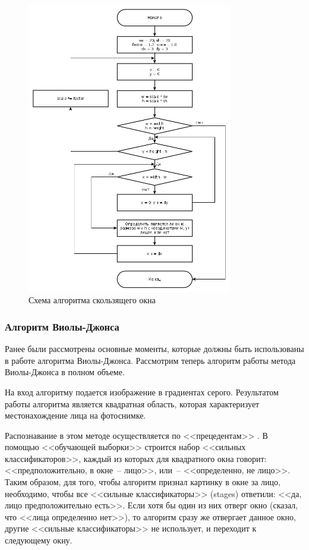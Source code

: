 \begin{figure}[p]
    \centering
    \includegraphics[width=0.8\textwidth]{lala_window.png}
    \caption{Схема алгоритма скользящего окна}
    \label{fig:lala_window}
\end{figure}

\subsubsection{Алгоритм Виолы-Джонса}

Ранее были рассмотрены основные моменты, которые должны быть использованы в работе алгоритма
Виолы-Джонса. Рассмотрим теперь алгоритм работы метода Виолы-Джонса в полном объеме.

На вход алгоритму подается изображение в градиентах серого. Результатом работы алгоритма
является квадратная область, которая характеризует местонахождение лица на фотоснимке.

Распознавание в этом методе осуществляется по <<прецедентам>> \cite{viola_jones_2}. В помощью
<<обучающей выборки>> строится набор <<сильных классификаторов>>, каждый из которых
для квадратного окна говорит: <<предположительно, в окне~-- лицо>>, или~--
<<определенно, не лицо>>. Таким образом, для того, чтобы алгоритм признал
картинку в окне за лицо, необходимо, чтобы все <<сильные классификаторы>> (stages)
ответили: <<да, лицо предположительно есть>>. Если хотя бы один из них отверг
окно (сказал, что <<лица определенно нет>>), то алгоритм сразу же отвергает
данное окно, другие <<сильные классификаторы>> не использует, и переходит
к следующему окну.

